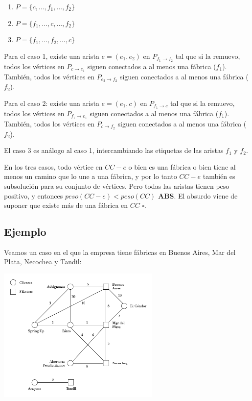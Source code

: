 \documentclass[a4paper]{report}
\begin{document}
\begin{enumerate}  
\item $P = \{c,...,f_1,...,f_2\}$
\item $P = \{f_1,...,c,...,f_2\}$
\item $P = \{f_1,...,f_2,...,c\}$
\end{enumerate}

Para el caso 1, existe una arista $e = (e_1, e_2)$ en $P_{f_1 \rightarrow f_2}$ tal que si la remuevo, todos los vértices en $P_{c \rightarrow e_1}$ siguen conectados a al menos una fábrica ($f_1$). También, todos los vértices en $P_{e_2 \rightarrow f_2}$ siguen conectados a al menos una fábrica ($f_2$).

Para el caso 2: existe una arista $e = (e_1, c)$ en $P_{f_1 \rightarrow c}$ tal que si la remuevo, todos los vértices en $P_{f_1 \rightarrow e_1}$ siguen conectados a al menos una fábrica ($f_1$). También, todos los vértices en $P_{c \rightarrow f_2}$ siguen conectados a al menos una fábrica ($f_2$).

El caso 3 es análogo al caso 1, intercambiando las etiquetas de las aristas $f_1$ y $f_2$.

En los tres casos, todo vértice en $CC - e$ o bien es una fábrica o bien tiene al menos un camino que lo une a una fábrica, y por lo tanto $CC - e$ también es subsolución para su conjunto de vértices.
Pero todas las aristas tienen peso positivo, y entonces $peso(CC - e) < peso(CC)$ \textbf{ABS}.
El absurdo viene de suponer que existe más de una fábrica en $CC$ $\square$.

\newpage

\subsection{Ejemplo}

Veamos un caso en el que la empresa tiene fábricas en Buenos Aires, Mar del Plata, Necochea y Tandil:

\begin{center}
    \includegraphics[width=0.6\textwidth]{elcondor-01.png}
\end{center}
\end{document}
